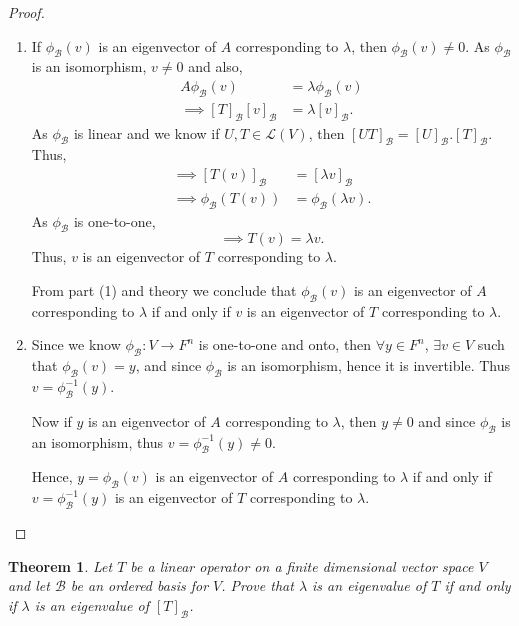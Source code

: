 \documentclass[12pt, a4paper]{article}
\newtheorem{theorem}{Theorem}[section]
\theoremstyle{definition}
\theoremstyle{remark}
\newcommand{\B}{\mathscr{B}}
\begin{document}
\begin{proof}
\begin{enumerate}
    \item If $\phi_\B(v)$ is an eigenvector of $A$ corresponding to $\lambda$, then $\phi_\B(v) \neq 0$. As $\phi_\B$ is an isomorphism, $v \neq 0$ and also,
    \begin{align*}
    A \phi_\B(v) &= \lambda \phi_\B(v) \\
    \implies [T]_\B [v]_\B &= \lambda [v]_\B.
    \end{align*}
    As $\phi_\B$ is linear and we know if $U, T \in \mathscr{L}(V)$, then $[UT]_\B = [U]_\B.[T]_\B$. Thus,
    \begin{align*}
    \implies [T(v)]_\B &= [\lambda v]_\B \\
    \implies \phi_\B(T(v)) &= \phi_\B(\lambda v).
    \end{align*}
    As $\phi_\B$ is one-to-one,
    \[
    \implies T(v) = \lambda v.
    \]
    Thus, $v$ is an eigenvector of $T$ corresponding to $\lambda$.

    From part (1) and theory we conclude that $\phi_\B(v)$ is an eigenvector of $A$ corresponding to $\lambda$ if and only if $v$ is an eigenvector of $T$ corresponding to $\lambda$.

    \item Since we know $\phi_\B : V \to F^n$ is one-to-one and onto, then $\forall y \in F^n$, $\exists v \in V$ such that $\phi_\B(v) = y$, and since $\phi_\B$ is an isomorphism, hence it is invertible. Thus $v = \phi_\B^{-1}(y)$.

    Now if $y$ is an eigenvector of $A$ corresponding to $\lambda$, then $y \neq 0$ and since $\phi_\B$ is an isomorphism, thus $v = \phi_\B^{-1}(y) \neq 0$.

    Hence, $y = \phi_\B(v)$ is an eigenvector of $A$ corresponding to $\lambda$ if and only if $v = \phi_\B^{-1}(y)$ is an eigenvector of $T$ corresponding to $\lambda$.
\end{enumerate}
\end{proof}

\begin{theorem}
Let $T$ be a linear operator on a finite dimensional vector space $V$ and let $\B$ be an ordered basis for $V$. Prove that $\lambda$ is an eigenvalue of $T$ if and only if $\lambda$ is an eigenvalue of $[T]_\B$.
\end{theorem}
\end{document}
